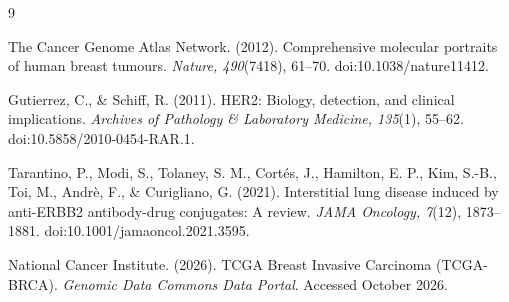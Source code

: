 \documentclass{article}
\begin{document}
\begin{thebibliography}{9}

The Cancer Genome Atlas Network. (2012).
Comprehensive molecular portraits of human breast tumours.
\textit{Nature, 490}(7418), 61--70.
doi:10.1038/nature11412.

Gutierrez, C., \& Schiff, R. (2011).
HER2: Biology, detection, and clinical implications.
\textit{Archives of Pathology \& Laboratory Medicine, 135}(1), 55--62.
doi:10.5858/2010-0454-RAR.1.

Tarantino, P., Modi, S., Tolaney, S. M., Cortés, J., Hamilton, E. P.,
Kim, S.-B., Toi, M., Andrè, F., \& Curigliano, G. (2021).
Interstitial lung disease induced by anti-ERBB2 antibody-drug conjugates:
A review.
\textit{JAMA Oncology, 7}(12), 1873--1881.
doi:10.1001/jamaoncol.2021.3595.

National Cancer Institute. (2026).
TCGA Breast Invasive Carcinoma (TCGA-BRCA).
\textit{Genomic Data Commons Data Portal}.
Accessed October 2026.

\end{thebibliography}
\end{document}
